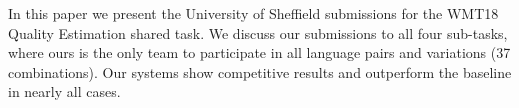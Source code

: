 In this paper we present the University of Sheffield submissions for the WMT18 Quality Estimation shared task. We discuss our submissions to all four sub-tasks, where ours is the only team to participate in all language pairs and variations (37 combinations). Our systems show competitive results and outperform the baseline in nearly all cases.
